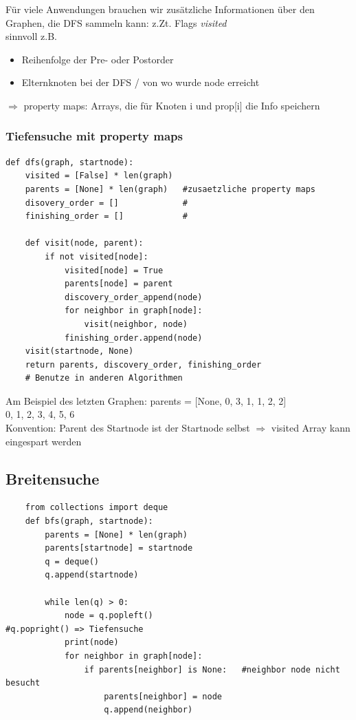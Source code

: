     Für viele Anwendungen brauchen wir zusätzliche Informationen über den Graphen, die DFS sammeln kann: z.Zt. Flags \emph{visited} \\
    sinnvoll z.B.
    \begin{itemize}
        \item Reihenfolge der Pre- oder Postorder
        \item Elternknoten bei der DFS / von wo wurde node erreicht
    \end{itemize}
    $\Rightarrow$ property maps: Arrays, die für Knoten i und prop[i] die Info speichern

    \subsubsection*{Tiefensuche mit property maps}
    \begin{verbatim}
def dfs(graph, startnode):
    visited = [False] * len(graph)
    parents = [None] * len(graph)   #zusaetzliche property maps
    disovery_order = []             #
    finishing_order = []            #

    def visit(node, parent):
        if not visited[node]:
            visited[node] = True
            parents[node] = parent
            discovery_order_append(node)
            for neighbor in graph[node]:
                visit(neighbor, node)
            finishing_order.append(node)
    visit(startnode, None)
    return parents, discovery_order, finishing_order
    # Benutze in anderen Algorithmen
    \end{verbatim}

    Am Beispiel des letzten Graphen:
    parents = [None, 0, 3, 1, 1, 2, 2]\\
    \hspace*{8.3cm} 0, 1, 2, 3, 4, 5, 6\\

    Konvention: Parent des Startnode ist der Startnode selbst $\Rightarrow$ visited Array kann eingespart werden\\


    \subsection*{Breitensuche}
    \begin{verbatim}
    from collections import deque
    def bfs(graph, startnode):
        parents = [None] * len(graph)
        parents[startnode] = startnode
        q = deque()
        q.append(startnode)

        while len(q) > 0:
            node = q.popleft()                              #q.popright() => Tiefensuche
            print(node)
            for neighbor in graph[node]:
                if parents[neighbor] is None:   #neighbor node nicht besucht
                    parents[neighbor] = node
                    q.append(neighbor)
    \end{verbatim}

